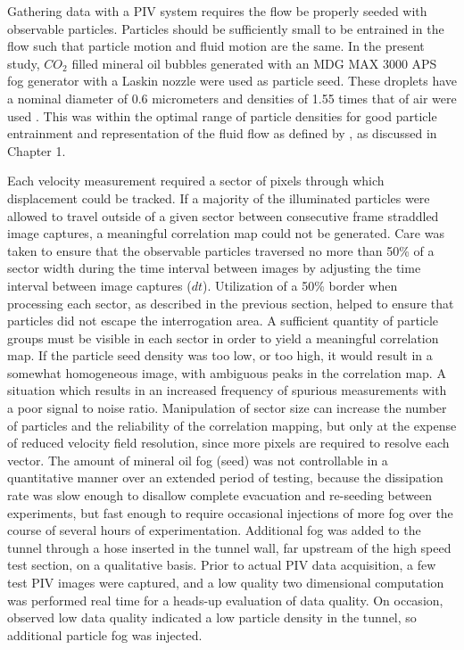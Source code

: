 Gathering data with a PIV system requires the flow be properly seeded with 
observable particles. Particles should be sufficiently small to be entrained in 
the flow such that particle motion and fluid motion are the same. In the 
present study, $CO_2$ filled mineral oil bubbles generated with an MDG MAX 3000 
APS fog generator with a Laskin nozzle were used as particle seed. These 
droplets have a nominal diameter of 0.6 micrometers and densities of 1.55 times 
that of air were used \cite{mdgfog}. This was within the optimal range of 
particle densities for good particle entrainment and representation of the 
fluid flow as defined by \cite{mei1996}, as discussed in Chapter 1.

Each velocity measurement 
required a sector of pixels through which displacement could be tracked. If 
a majority of the illuminated particles were allowed to travel outside of a 
given sector between consecutive frame straddled image captures, a meaningful 
correlation map could not be generated. Care was taken to ensure that the 
observable particles 
traversed no more than 50\% of a sector width during the time interval between 
images by adjusting the time interval between image captures ($dt$). 
Utilization of a 50\% border when processing each sector, as described in the 
previous section, helped to ensure that particles did not escape the 
interrogation area. A sufficient quantity of particle groups must be visible in 
each sector in order to yield a meaningful correlation map. If the particle 
seed density was too low, or too high, it would result in a somewhat 
homogeneous image, with ambiguous peaks in the correlation map. A situation 
which results in an increased frequency of spurious measurements with a 
poor signal to noise ratio. Manipulation of sector size 
can increase the number of particles and the reliability of the correlation 
mapping, but only at the expense of reduced velocity field resolution, since 
more pixels are required to resolve each vector.  The amount of mineral oil fog 
(seed) was not controllable in a quantitative manner over an extended period of 
testing, because the dissipation rate was slow enough to disallow complete 
evacuation and re-seeding between experiments, but fast enough to require 
occasional injections of more fog over the course of several hours of 
experimentation. Additional fog was added to the tunnel through a hose inserted 
in the tunnel wall, far upstream of the high speed test section, on a 
qualitative basis. Prior to actual PIV data acquisition, a few test PIV images 
were captured, and a low quality two dimensional computation was performed real 
time for a heads-up evaluation of data quality. On occasion, observed low data 
quality indicated a low particle density in the tunnel, 
so additional particle fog was injected.



